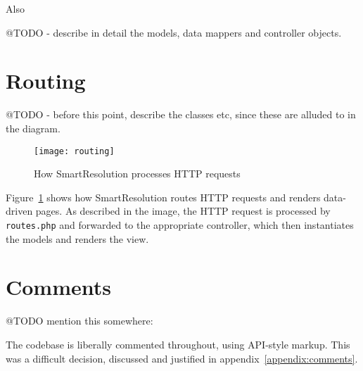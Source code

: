 Also

@TODO - describe in detail the models, data mappers and controller objects.

\section{Routing}

@TODO - before this point, describe the classes etc, since these are alluded to in the diagram.

\begin{figure}[h!]
  \centering
    \ifimages
    \texttt{[image: routing]}
    \fi
  \caption{How SmartResolution processes HTTP requests}
  \label{uml:routing}
\end{figure}

Figure~\ref{uml:routing} shows how SmartResolution routes HTTP requests and renders data-driven pages. As described in the image, the HTTP request is processed by \lstinline{routes.php} and forwarded to the appropriate controller, which then instantiates the models and renders the view.

\section{Comments}

@TODO mention this somewhere:

The codebase is liberally commented throughout, using API-style markup. This was a difficult decision, discussed and justified in appendix~\ref{appendix:comments}.